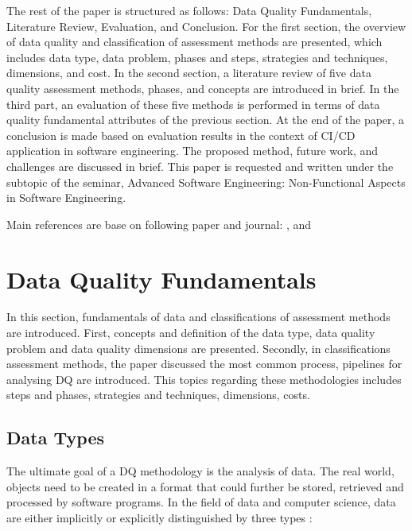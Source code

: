 \documentclass[pdftex,english,oribibl]{llncs}
\begin{document}
The rest of the paper is structured as follows: Data Quality Fundamentals, Literature Review, Evaluation, and Conclusion.
For the first section, the overview of data quality and classification of assessment methods are presented,
which includes data type, data problem, phases and steps, strategies and techniques, dimensions, and cost.
In the second section, a literature review of five data quality assessment methods, phases, and concepts are introduced in brief.
In the third part, an evaluation of these five methods is performed in terms of data quality fundamental attributes of the previous section.
At the end of the paper, a conclusion is made based on evaluation results in the context of CI/CD application in software engineering.
The proposed method, future work, and challenges are discussed in brief.
This paper is requested and written under the subtopic of the seminar, Advanced Software Engineering: Non-Functional Aspects in Software Engineering.

Main references are base on following paper and journal: \citet{Cai2005ChallnegesOfDataQuality}, \citet{Pipino2002DataQualityAssessment} and \citet{Batini2009MethodologiesForDataQuality} \citet{Wang1996BeyondAccuracy} \citet{Borek2011AClassficationOfDataQualityAssessmentMethods}
   \citet{Cappiello2004DataQualityAssessmentfromTheUse}


\section{Data Quality Fundamentals}
In this section, fundamentals of data and classifications of assessment methods are introduced.
First, concepts and definition of the data type, data quality problem and data quality dimensions are presented. Secondly, in classifications assessment methods, the paper discussed the most common process, pipelines for analysing DQ are introduced.
This topics regarding these methodologies includes steps and phases, strategies and techniques, dimensions, costs.

\subsection{Data Types}\label{sec:DataTypes}

The ultimate goal of a DQ methodology is the analysis of data.
The real world, objects need to be created in a format that could further be stored, retrieved and processed by software programs.
In the field of data and computer science, data are either implicitly or explicitly distinguished by three types \cite{Batini2009MethodologiesForDataQuality}:
\end{document}
